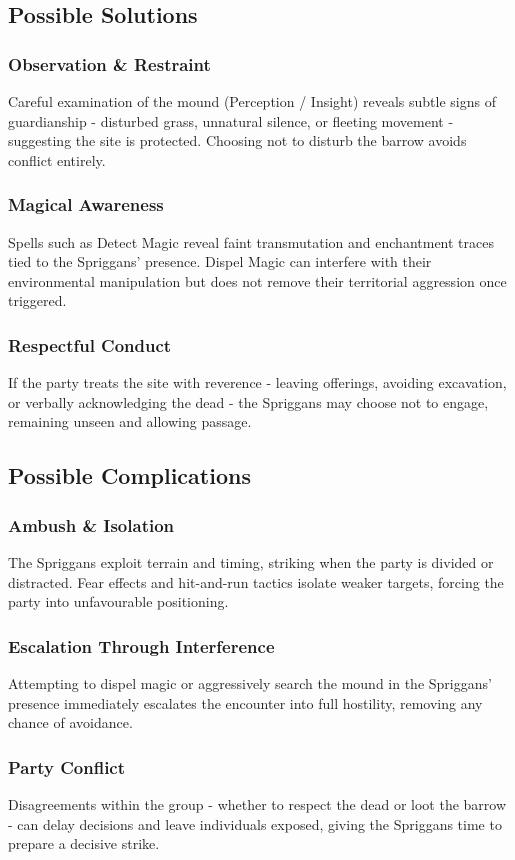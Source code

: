 \subsection*{Possible Solutions}
\subsubsection*{Observation \& Restraint}
{\entryfont Careful examination of the mound (Perception / Insight) reveals subtle signs of guardianship - disturbed grass, unnatural silence, or fleeting movement - suggesting the site is protected. Choosing not to disturb the barrow avoids conflict entirely.}
\subsubsection*{Magical Awareness}
{\entryfont Spells such as Detect Magic reveal faint transmutation and enchantment traces tied to the Spriggans' presence. Dispel Magic can interfere with their environmental manipulation but does not remove their territorial aggression once triggered.}
\subsubsection*{Respectful Conduct}
{\entryfont If the party treats the site with reverence - leaving offerings, avoiding excavation, or verbally acknowledging the dead - the Spriggans may choose not to engage, remaining unseen and allowing passage.}
\vfill\eject
\subsection*{Possible Complications}
\subsubsection*{Ambush \& Isolation}
{\entryfont The Spriggans exploit terrain and timing, striking when the party is divided or distracted. Fear effects and hit-and-run tactics isolate weaker targets, forcing the party into unfavourable positioning.}
\subsubsection*{Escalation Through Interference}
{\entryfont Attempting to dispel magic or aggressively search the mound in the Spriggans' presence immediately escalates the encounter into full hostility, removing any chance of avoidance.}
\subsubsection*{Party Conflict}
{\entryfont Disagreements within the group - whether to respect the dead or loot the barrow - can delay decisions and leave individuals exposed, giving the Spriggans time to prepare a decisive strike.}

